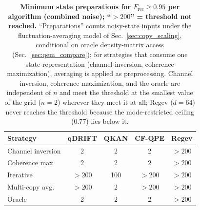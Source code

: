 \documentclass[12pt,a4paper]{article}
\newcommand{\Frec}{F_\mathrm{rec}}
\begin{document}
\begin{table}[b]
\caption{\textbf{Minimum state preparations for $\Frec \geq 0.95$ per algorithm (combined noise); ``$>200$'' = threshold not reached.}
``Preparations'' counts noisy-state inputs under the fluctuation-averaging model of Sec.~\ref{sec:copy_scaling}, conditional on oracle density-matrix access (Sec.~\ref{sec:qem_compare}); for strategies that consume one state representation (channel inversion, coherence maximization), averaging is applied as preprocessing.
Channel inversion, coherence maximization, and the oracle are independent of $n$ and meet the threshold at the smallest value of the grid ($n = 2$) wherever they meet it at all; Regev ($d = 64$) never reaches the threshold because the mode-restricted ceiling ($0.77$) lies below it.}
\label{tab:min_copies}

\begin{tabular}{lcccc}
Strategy & qDRIFT & QKAN & CF-QPE & Regev \\
\hline
Channel inversion & 2 & 2 & 2 & $>200$ \\
Coherence max     & 2 & 2 & 2 & $>200$ \\
Iterative         & $>200$ & 100 & $>200$ & $>200$ \\
Multi-copy avg.   & $>200$ & 2 & $>200$ & $>200$ \\
Oracle            & 2 & 2 & 2 & $>200$ \\
\end{tabular}

\end{table}
\end{document}
